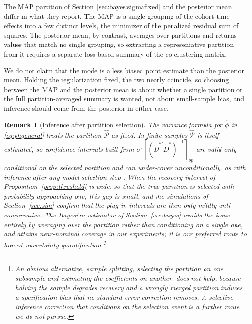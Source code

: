 \documentclass[margin=5in, 12pt]{article}
\newtheorem{remark}{Remark}
\newcommand{\1}{\mathbbm{1}}
\begin{document}
  The MAP partition of Section~\ref{sec:bayes:sigmafixed} and the posterior mean differ in what they report. The MAP is a single grouping of the cohort-time effects into a few distinct levels, the minimizer of the penalized residual sum of squares. The posterior mean, by contrast, averages over partitions and returns values that match no single grouping, so extracting a representative partition from it requires a separate loss-based summary of the co-clustering matrix.

  We do not claim that the mode is a less biased point estimate than the posterior mean. Holding the regularization fixed, the two nearly coincide, so choosing between the MAP and the posterior mean is about whether a single partition or the full partition-averaged summary is wanted, not about small-sample bias, and inference should come from the posterior in either case.

  \begin{remark}[Inference after partition selection]
  \label{rem:postselection}
  The variance formula for $\hat\phi$ in \eqref{eq:phgeneral} treats the
  partition $\hat{\mathcal{P}}$ as fixed. In finite samples $\hat{\mathcal{P}}$
  is itself estimated, so confidence intervals built from
  $\sigma^2[(\tilde D^{*\prime}\tilde D^*)^{-1}]_{pp}$ are valid only
  conditional on the selected partition and can under-cover
  unconditionally, as with inference after any model-selection step \citep{leeb2005}.
  When the recovery interval of Proposition~\ref{prop:threshold} is wide, so
  that the true partition is selected with probability approaching one, this
  gap is small, and the simulations of Section~\ref{sec:sim} confirm that the
  plug-in intervals are then only mildly anti-conservative. The Bayesian
  estimator of Section~\ref{sec:bayes} avoids the issue entirely by averaging
  over the partition rather than conditioning on a single one, and attains
  near-nominal coverage in our experiments; it is our preferred route to honest
  uncertainty quantification.\footnote{An obvious alternative, sample
  splitting, selecting the partition on one subsample and estimating the
  coefficients on another, does not help, because halving the sample degrades
  recovery and a wrongly merged partition induces a specification bias that no
  standard-error correction removes. A selective-inference correction that
  conditions on the selection event \citep{fithian2014, rinaldo2019} is a further
  route we do not pursue.}
  \end{remark}
\end{document}
